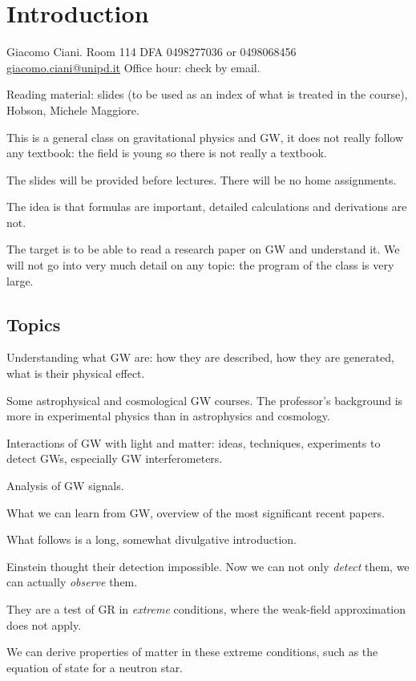 \documentclass[main.tex]{subfiles}
\begin{document}

\section{Introduction}

Giacomo Ciani. Room 114 DFA
0498277036 or 0498068456
\url{giacomo.ciani@unipd.it}
Office hour: check by email.

Reading material: slides (to be used as an index of what is treated in the course), Hobson, Michele Maggiore.

This is a general class on gravitational physics and GW, it does not really follow any textbook:
the field is young so there is not really a textbook. 

The slides will be provided before lectures. There will be no home assignments. 

The idea is that formulas are important, detailed calculations and derivations are not. 

The target is to be able to read a research paper on GW and understand it. 
We will not go into very much detail on any topic:
the program of the class is very large. 

\subsection{Topics}

Understanding what GW are: how they are described, how they are generated, what is their physical effect. 

Some astrophysical and cosmological GW courses. 
The professor's background is more in experimental physics than in astrophysics and cosmology. 

Interactions of GW with light and matter: ideas, techniques, experiments to detect GWs, especially GW interferometers.

Analysis of GW signals. 

What we can learn from GW, overview of the most significant recent papers. 

What follows is a long, somewhat divulgative introduction.

Einstein thought their detection impossible. 
Now we can not only \emph{detect} them, we can actually \emph{observe} them.

They are a test of GR in \emph{extreme} conditions, where the weak-field approximation does not apply.

We can derive properties of matter in these extreme conditions, such as the equation of state for a neutron star.
\end{document}

